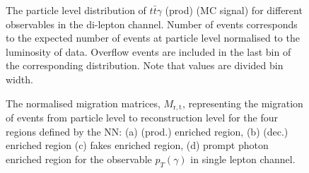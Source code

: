\begin{figure}[ht]
    \caption{The particle level distribution of $t\bar{t}\gamma$ (prod) (MC signal) for different observables in the di-lepton channel. Number of events corresponds to the expected number of events at particle level normalised to the luminosity of data. Overflow events are included in the last bin of the corresponding distribution.
    Note that values are divided bin width.}
    \label{fig:folding_input_dilep1}
\end{figure}
\FloatBarrier


\begin{figure}[ht]
    \centering
    \quad\quad
    \quad\quad
    \quad\quad
    \quad\quad
    \caption{The normalised migration matrices, $M_{\mathrm{r,t}}$, representing the migration of events from particle level to reconstruction level  for the four regions defined by the NN: (a) \tty (prod.) enriched region, (b) \tty (dec.) enriched region
    (c) fakes enriched region, (d) prompt photon enriched region for the observable $p_T(\gamma)$ in single lepton channel.}
    \label{fig:folding_input_migration_ljet}
\end{figure}
